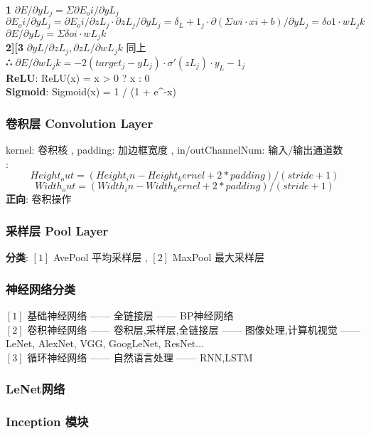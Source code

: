 \documentclass{article}
\begin{document}
\textbf{1} $\partial E/\partial yL_j = Σ\partial E_oi/\partial yL_j$\\
$\partial E_oi/\partial yL_j = \partial E_oi/\partial zL_j·\partial zL_j/\partial yL_j = δ_L+1_j·\partial (Σwi·xi + b)/\partial yL_j = δo1·wL_jk$\\
$\partial E/\partial yL_j = Σδoi·wL_jk$\\
\textbf{2][3} $\partial yL/\partial zL_j, \partial zL/\partial wL_jk$ 同上\\
\textbf{∴} $\partial E/\partial wL_jk = -2(target_j - yL_j)·σ'(zL_j)·y_L-1_j$\\
\textbf{ReLU}: ReLU(x) = x > 0 ? x : 0\\
\textbf{Sigmoid}: Sigmoid(x) = 1 / (1 + e^-x)\\

\subsubsection{卷积层 Convolution Layer}
kernel: 卷积核 \quad , \quad padding: 加边框宽度 \quad , \quad in/outChannelNum: 输入/输出通道数\\
\textbf{}:
$$ Height_out = (Height_in - Height_kernel + 2 * padding) / (stride + 1) $$
$$ Width_out = (Width_in - Width_kernel + 2 * padding) / (stride + 1) $$
\textbf{正向}: 卷积操作\\
	
\subsubsection{采样层 Pool Layer}
\textbf{分类}:	$[1]$ AvePool 平均采样层 \quad , \quad $[2]$ MaxPool 最大采样层

\subsubsection{神经网络分类}
$[1]$ 基础神经网络 —— 全链接层 —— BP神经网络\\
$[2]$ 卷积神经网络 —— 卷积层,采样层,全链接层 —— 图像处理,计算机视觉 —— LeNet, AlexNet, VGG, GoogLeNet, ResNet...\\
$[3]$ 循环神经网络 —— 自然语言处理 —— RNN,LSTM\\

\subsubsection{LeNet网络}
\subsubsection{Inception 模块}
\end{document}

